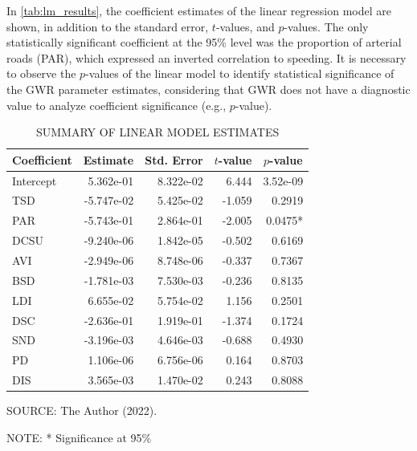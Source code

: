 In \autoref{tab:lm_results}, the coefficient estimates of the linear regression model are shown, in addition to the standard error, $t$-values, and $p$-values. The only statistically significant coefficient at the 95\% level was the proportion of arterial roads (PAR), which expressed an inverted correlation to speeding. It is necessary to observe the $p$-values of the linear model to identify statistical significance of the GWR parameter estimates, considering that GWR does not have a diagnostic value to analyze coefficient significance (e.g., $p$-value). 


\begin{table}[!htbp]
    \footnotesize
    \captionsetup{justification=raggedright,
        singlelinecheck=false,
        font=footnotesize}
    \caption{SUMMARY OF LINEAR MODEL ESTIMATES}
    \centering
    \begin{tabular}{lrrrr}
        \hline
        \multicolumn{1}{c}{\textbf{Coefficient}} & \multicolumn{1}{c}{\textbf{Estimate}} & \multicolumn{1}{c}{\textbf{Std. Error}} & \multicolumn{1}{c}{\textbf{$t$-value}} & \multicolumn{1}{c}{\textbf{$p$-value}}  \\
        \hline
        Intercept  &  5.362e-01 & 8.322e-02 &  6.444 &  3.52e-09 \\
        TSD        & -5.747e-02 & 5.425e-02 & -1.059 &  0.2919   \\
        PAR        & -5.743e-01 & 2.864e-01 & -2.005 &  0.0475*  \\ 
        DCSU       & -9.240e-06 & 1.842e-05 & -0.502 &  0.6169   \\ 
        AVI        & -2.949e-06 & 8.748e-06 & -0.337 &  0.7367   \\ 
        BSD        & -1.781e-03 & 7.530e-03 & -0.236 &  0.8135   \\ 
        LDI        &  6.655e-02 & 5.754e-02 &  1.156 &  0.2501   \\ 
        DSC        & -2.636e-01 & 1.919e-01 & -1.374 &  0.1724   \\ 
        SND        & -3.196e-03 & 4.646e-03 & -0.688 &  0.4930   \\ 
        PD         &  1.106e-06 & 6.756e-06 &  0.164 &  0.8703   \\ 
        DIS        &  3.565e-03 & 1.470e-02 &  0.243 &  0.8088   \\ 
        \hline
    \end{tabular}
    \label{tab:lm_results}
    \par \vspace{2mm} \footnotesize \raggedright
    SOURCE: The Author (2022).
    \par 
    NOTE: * Significance at 95\%
\end{table}

